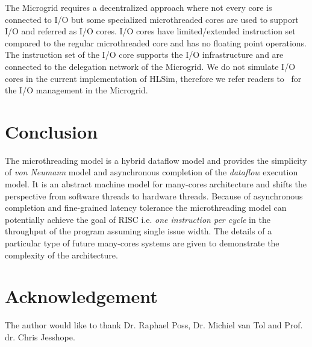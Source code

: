 \documentclass{article}
\begin{document}
The Microgrid requires a decentralized approach where not every core is
connected to I/O but some specialized microthreaded cores are used to support
I/O and referred as I/O cores. I/O cores have limited/extended instruction
set~\cite{mgsim14} compared to the regular microthreaded core and has no
floating point operations. The instruction set of the I/O core supports the I/O
infrastructure and are connected to the delegation network of the Microgrid. We
do not simulate I/O cores in the current implementation of HLSim, therefore we
refer readers to~\cite{hicks09-io,poss.12,poss.12.rapido} for the I/O
management in the Microgrid.

\section{Conclusion}
\label{sn:conclusion}

The microthreading model is a hybrid dataflow model and provides the simplicity
of \emph{von Neumann} model and asynchronous completion of the \emph{dataflow}
execution model. It is an abstract machine model for many-cores architecture
and shifts the perspective from software threads to hardware threads. Because
of asynchronous completion and fine-grained latency tolerance the
microthreading model can potentially achieve the goal of RISC i.e. \emph{one
instruction per cycle} in the throughput of the program assuming single issue
width. The details of a particular type of future many-cores systems are given
to demonstrate the complexity of the architecture. 

\section*{Acknowledgement}
The author would like to thank Dr. Raphael Poss, Dr. Michiel van Tol and Prof.
dr. Chris Jesshope.











\end{document}
